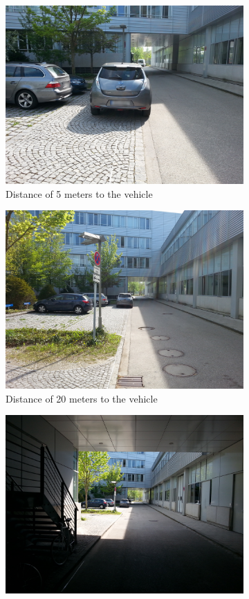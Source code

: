 \begin{figure}[t]
\begin{subfigure}[b]{0.5\textwidth}
\centering
\includegraphics[width=0.75\linewidth]{img/elwoplate5m.jpg}
\caption{Distance of 5 meters to the vehicle}
\end{subfigure}
\begin{subfigure}[b]{0.5\textwidth}
\centering
\includegraphics[width=0.75\linewidth]{img/elwoplate20m.jpg}
\caption{Distance of 20 meters to the vehicle}
\end{subfigure}
\begin{subfigure}[b]{0.5\textwidth}
\centering
\includegraphics[width=0.75\linewidth]{img/elwoplate35m.jpg}

\end{subfigure}
\end{figure}
